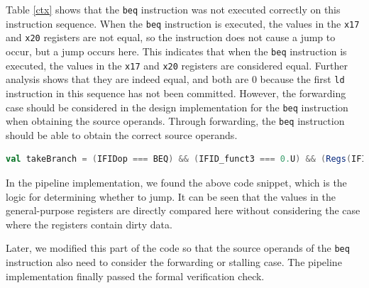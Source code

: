 \documentclass[conference]{IEEEtran}
\theoremstyle{definition}
\begin{document}
Table \ref{ctx} shows that the \verb|beq| instruction was not executed correctly on this instruction sequence.
When the \verb|beq| instruction is executed, the values in the \verb|x17| and \verb|x20| registers are not equal, so the instruction does not cause a jump to occur, but a jump occurs here.
This indicates that when the \verb|beq| instruction is executed, the values in the \verb|x17| and \verb|x20| registers are considered equal.
Further analysis shows that they are indeed equal, and both are 0 because the first \verb|ld| instruction in this sequence has not been committed.
However, the forwarding case should be considered in the design implementation for the \verb|beq| instruction when obtaining the source operands.
Through forwarding, the \verb|beq| instruction should be able to obtain the correct source operands.

\begin{lstlisting}[language=scala, caption={A Code Snippet in the Pipeline Design}, label=designcode]
val takeBranch = (IFIDop === BEQ) && (IFID_funct3 === 0.U) && (Regs(IFIDrs1) === Regs(IFIDrs2))
\end{lstlisting}

In the pipeline implementation, we found the above code snippet, which is the logic for determining whether to jump.
It can be seen that the values in the general-purpose registers are directly compared here without considering the case where the registers contain dirty data.

Later, we modified this part of the code so that the source operands of the \verb|beq| instruction also need to consider the forwarding or stalling case. 
The pipeline implementation finally passed the formal verification check.
\end{document}
